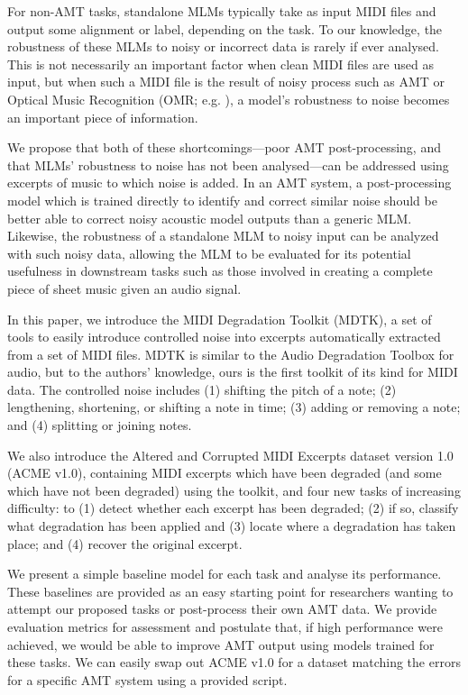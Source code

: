 \documentclass{article}
\begin{document}
For non-AMT tasks, standalone MLMs typically take as input MIDI files and output some alignment or label, depending on the task. To our knowledge, the robustness of these MLMs to noisy or incorrect data is rarely if ever analysed. This is not necessarily an important factor when clean MIDI files are used as input, but when such a MIDI file is the result of noisy process such as AMT or Optical Music Recognition (OMR; e.g. \cite{van2017optical}), a model's robustness to noise becomes an important piece of information.

We propose that both of these shortcomings---poor AMT post-processing, and that MLMs' robustness to noise has not been analysed---can be addressed using excerpts of music to which noise is added. In an AMT system, a post-processing model which is trained directly to identify and correct similar noise should be better able to correct noisy acoustic model outputs than a generic MLM. Likewise, the robustness of a standalone MLM to noisy input can be analyzed with such noisy data, allowing the MLM to be evaluated for its potential usefulness in downstream tasks such as those involved in creating a complete piece of sheet music given an audio signal.

In this paper, we introduce the MIDI Degradation Toolkit (MDTK), a set of tools to easily introduce controlled noise into excerpts automatically extracted from a set of MIDI files. MDTK is similar to the Audio Degradation Toolbox \cite{matthias2013a} for audio, but to the authors' knowledge, ours is the first toolkit of its kind for MIDI data. The controlled noise includes (1) shifting the pitch of a note; (2) lengthening, shortening, or shifting a note in time; (3) adding or removing a note; and (4) splitting or joining notes.

We also introduce the Altered and Corrupted MIDI Excerpts dataset version 1.0 (ACME v1.0), containing MIDI excerpts which have been degraded (and some which have not been degraded) using the toolkit, and four new tasks of increasing difficulty: to (1) detect whether each excerpt has been degraded; (2) if so, classify what degradation has been applied and (3) locate where a degradation has taken place; and (4) recover the original excerpt.

We present a simple baseline model for each task and analyse its performance. These baselines are provided as an easy starting point for researchers wanting to attempt our proposed tasks or post-process their own AMT data. We provide evaluation metrics for assessment and postulate that, if high performance were achieved, we would be able to improve AMT output using models trained for these tasks. We can easily swap out ACME v1.0 for a dataset matching the errors for a specific AMT system using a provided script.
\end{document}
